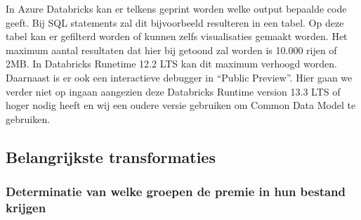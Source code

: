 In Azure Databricks kan er telkens geprint worden welke output bepaalde code geeft. Bij SQL statements zal dit bijvoorbeeld resulteren in een tabel. Op deze tabel kan er gefilterd worden of kunnen zelfs visualisaties gemaakt worden. Het maximum aantal resultaten dat hier bij getoond zal worden is 10.000 rijen of 2MB. In Databricks Runetime 12.2 LTS kan dit maximum verhoogd worden. Daarnaast is er ook een interactieve debugger in ``Public Preview''. Hier gaan we verder niet op ingaan aangezien deze Databricks Runtime version 13.3 LTS of hoger nodig heeft en wij een oudere versie gebruiken om Common Data Model te gebruiken.

\subsection{Belangrijkste transformaties}

\subsubsection{Determinatie van welke groepen de premie in hun bestand krijgen}

